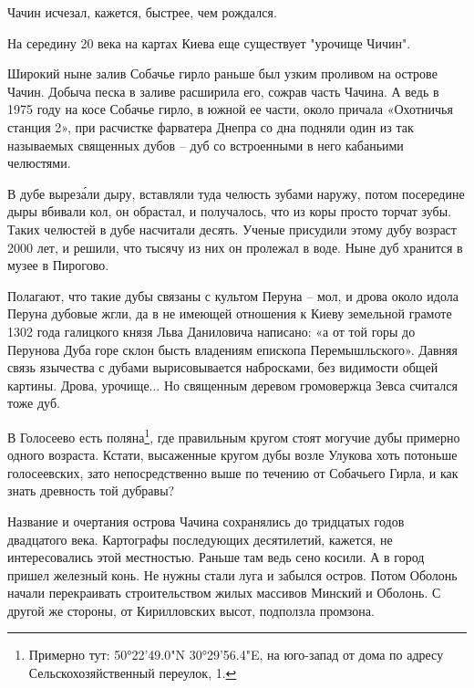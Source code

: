 Чачин исчезал, кажется, быстрее, чем рождался. 

На середину 20 века на картах Киева еще существует "урочище Чичин".

Широкий ныне залив Собачье гирло раньше был узким проливом на острове Чачин. Добыча песка в заливе расширила его, сожрав часть Чачина. А ведь в 1975 году на косе Собачье гирло, в южной ее части, около причала «Охотничья станция 2», при расчистке фарватера Днепра со дна подняли один из так называемых священных дубов – дуб со встроенными в него кабаньими челюстями.

В дубе вырез\'али дыру, вставляли туда челюсть зубами наружу, потом посередине дыры вбивали кол, он обрастал, и получалось, что из коры просто торчат зубы. Таких челюстей в дубе насчитали десять. Ученые присудили этому дубу возраст 2000 лет, и решили, что тысячу из них он пролежал в воде. Ныне дуб хранится в музее в Пирогово.

Полагают, что такие дубы связаны с культом Перуна – мол, и дрова около идола Перуна дубовые жгли, да в не имеющей отношения к Киеву земельной грамоте 1302 года галицкого князя Льва Даниловича написано: «а от той горы до Перунова Дуба горе склон бысть владениям епископа Перемышльского». Давняя связь язычества с дубами вырисовывается набросками, без видимости общей картины. Дрова, урочище... Но священным деревом громовержца Зевса считался тоже дуб.

В Голосеево есть поляна\footnote{Примерно тут: 50°22'49.0"N 30°29'56.4"E, на юго-запад от дома по адресу Сельскохозяйственный переулок, 1.}, где правильным кругом стоят могучие дубы примерно одного возраста. Кстати, высаженные кругом дубы возле Улукова хоть потоньше голосеевских, зато непосредственно выше по течению от Собачьего Гирла, и как знать древность той дубравы?


Название и очертания острова Чачина сохранялись до тридцатых годов двадцатого века. Картографы последующих десятилетий, кажется, не интересовались этой местностью. Раньше там ведь сено косили. А в город пришел железный конь. Не нужны стали луга и забылся остров. Потом Оболонь начали перекраивать строительством жилых массивов Минский и Оболонь. С другой же стороны, от Кирилловских высот, подползла промзона.

